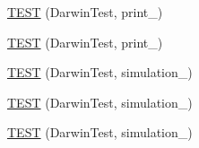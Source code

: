 \begin{DoxyCompactItemize}
\item 
\hyperlink{TestDarwin_8c_09_09_ad4b1965b7df6c94ce3894d17c0bd97ec}{T\-E\-S\-T} (Darwin\-Test, print\-\_)
\item 
\hyperlink{TestDarwin_8c_09_09_aaef95df9319f9da416b4dc9b54073758}{T\-E\-S\-T} (Darwin\-Test, print\-\_)
\item 
\hyperlink{TestDarwin_8c_09_09_af916add2b5cc92232a21225018d9737c}{T\-E\-S\-T} (Darwin\-Test, simulation\-\_)
\item 
\hyperlink{TestDarwin_8c_09_09_aa3adfe620fda3dba196f321666439017}{T\-E\-S\-T} (Darwin\-Test, simulation\-\_)
\item 
\hyperlink{TestDarwin_8c_09_09_a1a7aece309a1556251c8a1ae523e5530}{T\-E\-S\-T} (Darwin\-Test, simulation\-\_)
\end{DoxyCompactItemize}


